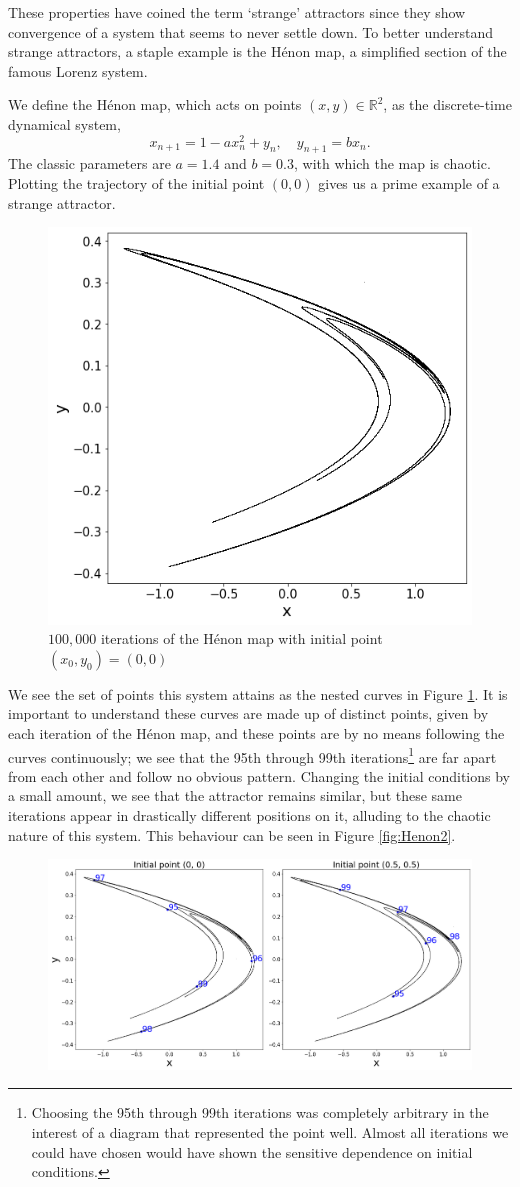 These properties have coined the term `strange' attractors\cite{feldman2012chaos} since they show convergence of a system that seems to never settle down. To better understand strange attractors, a staple example is the Hénon map\cite{nonlinear_system}, a simplified section of the famous Lorenz system.
\begin{exmp}
    We define the Hénon map, which acts on points $(x,y)\in \mathbb{R}^2$, as the discrete-time dynamical system, 
    \[
x_{n+1} = 1 - a x_n^2 + y_n, \quad y_{n+1} = b x_n.
    \]
    The classic parameters are $a=1.4$ and $b=0.3$, with which the map is chaotic. Plotting the trajectory of the initial point $(0,0)$ gives us a prime example of a strange attractor.
    \begin{figure}
        \centering
        \includegraphics[width=0.4\linewidth]{Images/Henon attractor.png}
        \caption{$100,000$ iterations of the Hénon map with initial point $(x_0, y_0)=(0,0)$}
        \label{fig:Henon1}
    \end{figure}
    We see the set of points this system attains as the nested curves in Figure \ref{fig:Henon1}. It is important to understand these curves are made up of distinct points, given by each iteration of the Hénon map, and these points are by no means following the curves continuously; we see that the 95th through 99th iterations\footnote{Choosing the 95th through 99th iterations was completely arbitrary in the interest of a diagram that represented the point well. Almost all iterations we could have chosen would have shown the sensitive dependence on initial conditions.} are far apart from each other and follow no obvious pattern. Changing the initial conditions by a small amount, we see that the attractor remains similar, but these same iterations appear in drastically different positions on it, alluding to the chaotic nature of this system. This behaviour can be seen in Figure \ref{fig:Henon2}.
    \begin{figure}
        \centering
        \includegraphics[width=0.75\linewidth]{Images/Henon attractor with labels.png}

\end{figure}
\end{exmp}
